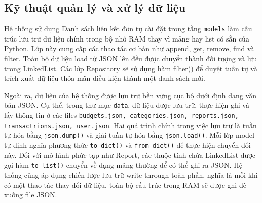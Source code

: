 \documentclass[12pt,letterpaper]{article}
\begin{document}
\subsection{Kỹ thuật quản lý và xử lý dữ liệu}

Hệ thống sử dụng Danh sách liên kết đơn tự cài đặt trong tầng \texttt{models} làm cấu trúc lưu trữ dữ liệu chính trong bộ nhớ RAM thay vì mảng hay list có sẵn của Python. Lớp này cung cấp các thao tác cơ bản như append, get, remove, find và filter. Toàn bộ dữ liệu load từ JSON lên đều được chuyển thành đối tượng và lưu trong LinkedList. Các lớp Repository sẽ sử dụng hàm filter() để duyệt tuần tự và trích xuất dữ liệu thỏa mãn điều kiện thành một danh sách mới.

Ngoài ra, dữ liệu của hệ thống được lưu trữ bền vững cục bộ dưới định dạng văn bản JSON. Cụ thể, trong thư mục \texttt{data}, dữ liệu được lưu trữ, thực hiện ghi và lấy thông tin ở các files \texttt{budgets.json, categories.json, reports.json, transactrions.json, user.json}. Hai quá trình chính trong việc lưu trữ là tuần tự hóa bằng \texttt{json.dump()} và giải tuần tự hóa bằng \texttt{json.load()}. Mỗi lớp model tự định nghĩa phương thức \texttt{to\_dict()} và \texttt{from\_dict()} để thực hiện chuyển đổi này. Đối với mô hình phức tạp như Report, các thuộc tính chứa LinkedList được gọi hàm \texttt{to\_list()} chuyển về dạng mảng thường để có thể ghi ra JSON. Hệ thống cũng áp dụng chiến lược lưu trữ write-through toàn phần, nghĩa là mỗi khi có một thao tác thay đổi dữ liệu, toàn bộ cấu trúc trong RAM sẽ được ghi đè xuống file JSON.
\end{document}
